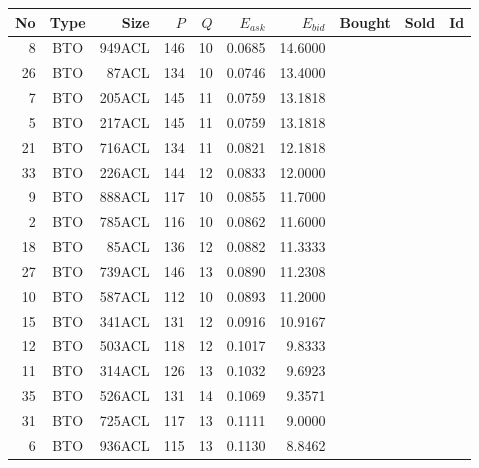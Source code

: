 \begin{tabular}{|r|c|r|r|r|r|r|p{2cm}|p{2cm}|r|}
\hline

No & Type & Size & $P$ & $Q$ & $E_{ask}$ & $E_{bid}$ & Bought & Sold & Id \\
\hline
8 & BTO & 949ACL & 146 & 10 & 0.0685 & 14.6000 &    &    &    \\
\hline
26 & BTO & 87ACL & 134 & 10 & 0.0746 & 13.4000 &    &    &    \\
\hline
7 & BTO & 205ACL & 145 & 11 & 0.0759 & 13.1818 &    &    &    \\
\hline
5 & BTO & 217ACL & 145 & 11 & 0.0759 & 13.1818 &    &    &    \\
\hline
21 & BTO & 716ACL & 134 & 11 & 0.0821 & 12.1818 &    &    &    \\
\hline
33 & BTO & 226ACL & 144 & 12 & 0.0833 & 12.0000 &    &    &    \\
\hline
9 & BTO & 888ACL & 117 & 10 & 0.0855 & 11.7000 &    &    &    \\
\hline
2 & BTO & 785ACL & 116 & 10 & 0.0862 & 11.6000 &    &    &    \\
\hline
18 & BTO & 85ACL & 136 & 12 & 0.0882 & 11.3333 &    &    &    \\
\hline
27 & BTO & 739ACL & 146 & 13 & 0.0890 & 11.2308 &    &    &    \\
\hline
10 & BTO & 587ACL & 112 & 10 & 0.0893 & 11.2000 &    &    &    \\
\hline
15 & BTO & 341ACL & 131 & 12 & 0.0916 & 10.9167 &    &    &    \\
\hline
12 & BTO & 503ACL & 118 & 12 & 0.1017 & 9.8333 &    &    &    \\
\hline
11 & BTO & 314ACL & 126 & 13 & 0.1032 & 9.6923 &    &    &    \\
\hline
35 & BTO & 526ACL & 131 & 14 & 0.1069 & 9.3571 &    &    &    \\
\hline
31 & BTO & 725ACL & 117 & 13 & 0.1111 & 9.0000 &    &    &    \\
\hline
6 & BTO & 936ACL & 115 & 13 & 0.1130 & 8.8462 &    &    &    \\
\hline
\end{tabular}
